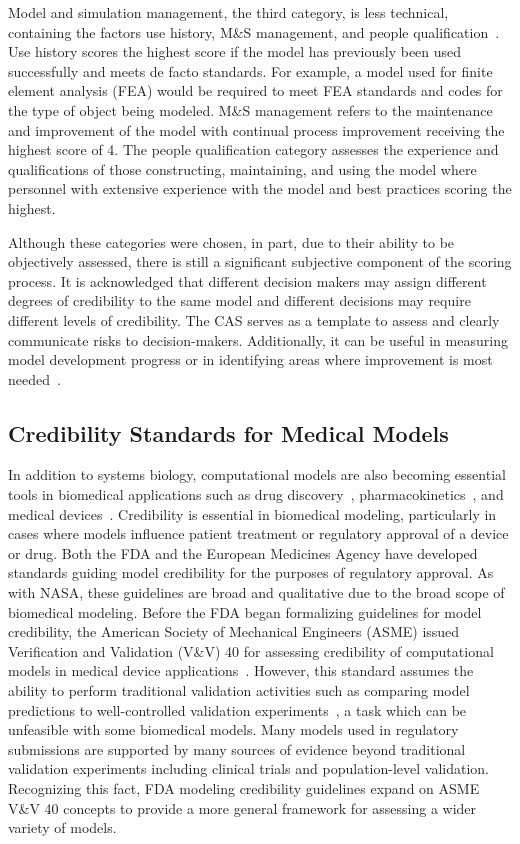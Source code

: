 \documentclass[12pt]{report}
\begin{document}
Model and simulation management, the third category, is less technical, containing the factors use history, M\&S management, and people qualification~\cite{babula_nasa_2009}. Use history scores the highest score if the model has previously been used successfully and meets de facto standards. For example, a model used for finite element analysis (FEA) would be required to meet FEA standards and codes for the type of object being modeled. M\&S management refers to the maintenance and improvement of the model with continual process improvement receiving the highest score of 4.  The people qualification category assesses the experience and qualifications of those constructing, maintaining, and using the model where personnel with extensive experience with the model and best practices scoring the highest. 

Although these categories were chosen, in part, due to their ability to be objectively assessed, there is still a significant subjective component of the scoring process. It is acknowledged that different decision makers may assign different degrees of credibility to the same model and different decisions may require different levels of credibility. The CAS serves as a template to assess and clearly communicate risks to decision-makers. Additionally, it can be useful in measuring model development progress or in identifying areas where improvement is most needed~\cite{Blattnig2013-qx}.


\subsection{Credibility Standards for Medical Models}
In addition to systems biology, computational models are also becoming essential tools in biomedical applications such as drug discovery~\cite{Chen2015}, pharmacokinetics~\cite{Kuh2000}, and medical devices~\cite{Kung2019}. Credibility is essential in biomedical modeling, particularly in cases where models influence patient treatment or regulatory approval of a device or drug. Both the FDA and the European Medicines Agency have developed standards guiding model credibility for the purposes of regulatory approval. As with NASA, these guidelines are broad and qualitative due to the broad scope of biomedical modeling. Before the FDA began formalizing guidelines for model credibility, the American Society of Mechanical Engineers (ASME) issued Verification and Validation (V\&V) 40 for assessing credibility of computational models in medical device applications~\cite{viceconti_credibility_2020}. However, this standard assumes the ability to perform traditional validation activities such as comparing model predictions to well-controlled validation experiments~\cite{FDAguidelines}, a task which can be unfeasible with some biomedical models. Many models used in regulatory submissions are supported by many sources of evidence beyond traditional validation experiments including clinical trials and population-level validation. Recognizing this fact, FDA modeling credibility guidelines expand on ASME V\&V 40 concepts to provide a more general framework for assessing a wider variety of models.
\end{document}
